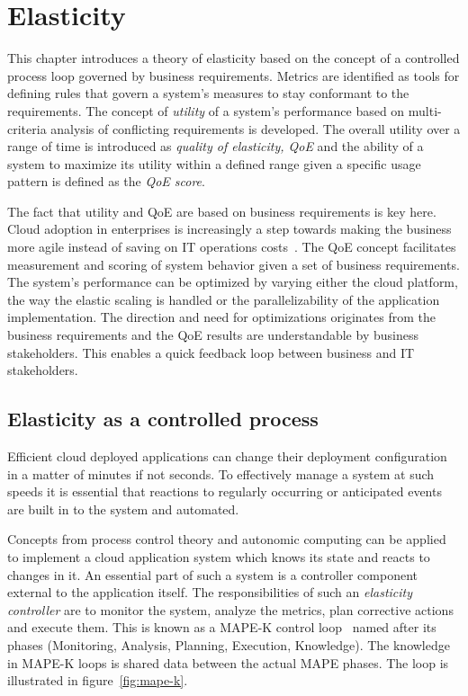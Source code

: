 \documentclass[english]{tktltiki2}
\theoremstyle{definition}
\theoremstyle{remark}
\begin{document}
\section{Elasticity}  
\label{sec:elasticity}

This chapter introduces a theory of elasticity based on the concept of a
controlled process loop governed by business requirements. Metrics are
identified as tools for defining rules that govern a system's measures to stay
conformant to the requirements. The concept of \textit{utility} of a system's
performance based on multi-criteria analysis of conflicting requirements is
developed. The overall utility over a range of time is introduced as
\textit{quality of elasticity, QoE} and the ability of a system to maximize its
utility within a defined range given a specific usage pattern is defined as the
\textit{QoE score}.

The fact that utility and QoE are based on business requirements is key here. Cloud adoption in enterprises is increasingly a step towards making the business more agile instead of saving on IT operations costs~\cite{cloudberkeleyviewacm}. The QoE concept facilitates measurement and scoring of system behavior given a set of business requirements. The system's performance can be optimized by varying either the cloud platform, the way the elastic scaling is handled or the parallelizability of the application implementation. The direction and need for optimizations originates from the business requirements and the QoE results are understandable by business stakeholders. This enables a quick feedback loop between business and IT stakeholders.

\subsection{Elasticity as a controlled process}
\label{sec:elasticity_as_a_controlled_process}

Efficient cloud deployed applications can change their deployment configuration in a matter of minutes if not seconds. To effectively manage a system at such speeds it
is essential that reactions to regularly occurring or anticipated events are
built in to the system and automated.

Concepts from process control theory and autonomic computing can be applied to
implement a cloud application system which knows its state and reacts to changes
in it. An essential part of such a system is a controller component external to
the application itself. The responsibilities of such an \emph{elasticity controller}
are to monitor the system, analyze the metrics, plan corrective actions and
execute them. This is known as a MAPE-K control
loop~\cite{Huebscher2008}\cite{Mueller2009} named after its phases (Monitoring,
Analysis, Planning, Execution, Knowledge). The knowledge in MAPE-K loops is
shared data between the actual MAPE phases. The loop is illustrated in figure~\ref{fig:mape-k}.
\end{document}

